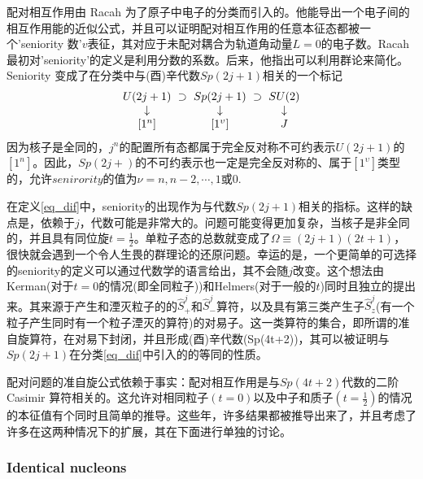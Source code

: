 配对相互作用由 Racah 为了原子中电子的分类而引入的。他能导出一个电子间的相互作用能的近似公式，并且可以证明配对相互作用的任意本征态都被一个'seniority 数'$v$表征，其对应于未配对耦合为轨道角动量$L=0$的电子数。Racah 最初对'seniority'的定义是利用分数的系数。后来，他指出可以利用群论来简化。Seniority 变成了在分类中与(酉)辛代数$Sp(2j+1)$相关的一个标记
\begin{equation}\label{eq_dif}
{\setlength\arraycolsep{3pt}\renewcommand{\arraystretch}{1}
\begin{array}{ccccc}
U(2j+1)&\supset&Sp(2j+1)&\supset&SU(2)\\
\downarrow& &\downarrow& &\downarrow\\
\textrm{[}1^{n}\textrm{]}& &[1^\upsilon]& &J
\end{array}}
\end{equation}
因为核子是全同的，$j^n$的配置所有态都属于完全反对称不可约表示$U(2j+1)$的$[1^n]$。因此，$Sp(2j+)$的不可约表示也一定是完全反对称的、属于$[1^\upsilon]$类型的，允许$senirority$的值为$\nu=n,n-2,\cdots,1$或0.

在定义\ref{eq_dif}中，seniority的出现作为与代数$Sp(2j+1)$相关的指标。这样的缺点是，依赖于$j$，代数可能是非常大的。问题可能变得更加复杂，当核子是非全同的，并且具有同位旋$t=\frac{1}{2}$。单粒子态的总数就变成了$\Omega\equiv(2j+1)(2t+1)$，很快就会遇到一个令人生畏的群理论的还原问题。幸运的是，一个更简单的可选择的seniority的定义可以通过代数学的语言给出，其不会随$j$改变。这个想法由Kerman(对于$t=0$的情况(即全同粒子))和Helmers(对于一般的$t$)同时且独立的提出来。其来源于产生和湮灭粒子的的$\hat{S}_+^j$和$\hat{S}_-^j$算符，以及具有第三类产生子$\hat{S}^j_z$(有一个粒子产生同时有一个粒子湮灭的算符)的对易子。这一类算符的集合，即所谓的准自旋算符，在对易下封闭，并且形成(酉)辛代数(Sp(4t+2))，其可以被证明与$Sp(2j+1)$在分类\ref{eq_dif}中引入的的等同的性质。

配对问题的准自旋公式依赖于事实：配对相互作用是与$Sp(4t+2)$代数的二阶 Casimir 算符相关的。这允许对相同粒子$(t=0)$以及中子和质子$(t=\frac{1}{2})$的情况的本征值有个同时且简单的推导。这些年，许多结果都被推导出来了，并且考虑了许多在这两种情况下的扩展，其在下面进行单独的讨论。

\subsubsection{Identical nucleons}

